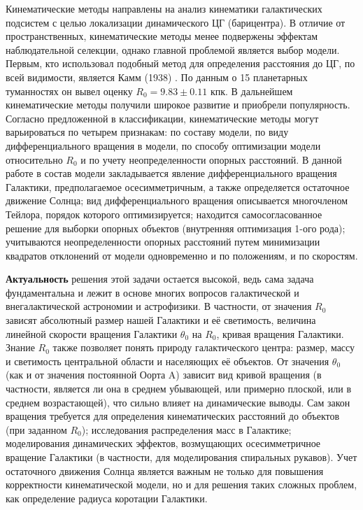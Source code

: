 \documentclass[a4paper, oneside, 14pt]{article}
\begin{document}
Кинематические методы направлены на анализ кинематики галактических подсистем с целью локализации динамического ЦГ (барицентра). В отличие от пространственных, кинематические методы менее подвержены эффектам наблюдательной селекции, однако главной проблемой является выбор модели. Первым, кто использовал подобный метод для определения расстояния до ЦГ, по всей видимости, является Камм (1938) \cite{C.1938}. По данным о 15 планетарных туманностях он вывел оценку $ R_0 = 9.83 \pm 0.11 $ кпк. В дальнейшем кинематические методы получили широкое развитие и приобрели популярность. Согласно предложенной в \cite{N.2003} классификации, кинематические методы могут варьироваться по четырем признакам: по составу модели, по виду дифференциального вращения в модели, по способу оптимизации модели относительно $ R_0 $ и по учету неопределенности опорных расстояний. В данной работе в состав модели закладывается явление дифференциального вращения Галактики, предполагаемое осесимметричным, а также определяется остаточное движение Солнца; вид дифференциального вращения описывается многочленом Тейлора, порядок которого оптимизируется; находится самосогласованное решение для выборки опорных объектов (внутренняя оптимизация 1-ого рода); учитываются неопределенности опорных расстояний путем минимизации квадратов отклонений от модели одновременно и по положениям, и по скоростям.

\textbf{Актуальность} решения этой задачи остается высокой, ведь сама задача фундаментальна и лежит в основе многих вопросов галактической и внегалактической астрономии и астрофизики. В частности, от значения $ R_0 $ зависят \cite{N.2003} абсолютный размер нашей Галактики и её светимость, величина линейной скорости вращения Галактики $ \theta_0 $ на $ R_0 $, кривая вращения Галактики. Знание $ R_0 $ также позволяет понять природу галактического центра: размер, массу и светимость центральной области и населяющих её объектов. От значения $ \theta_0 $ (как и от значения постоянной Оорта A) зависит вид кривой вращения (в частности, является ли она в среднем убывающей, или примерно плоской, или в среднем возрастающей), что сильно влияет на динамические выводы. Сам закон вращения требуется для определения кинематических расстояний до объектов (при заданном $ R_0 $); исследования распределения масс в Галактике; моделирования динамических эффектов, возмущающих осесимметричное вращение Галактики (в частности, для моделирования спиральных рукавов). Учет остаточного движения Солнца является важным не только для повышения корректности кинематической модели, но и для решения таких сложных проблем, как определение радиуса коротации Галактики.
\end{document}
